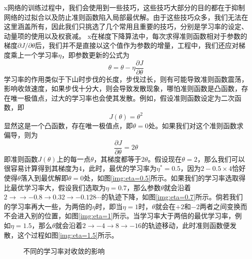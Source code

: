 x网络的训练过程中，我们会使用到一些技巧，这些技巧大部分的目的都在于抑制网络的过拟合以及防止准则函数陷入局部最优解。由于这些技巧众多，我们无法在这里涵盖所有，因此我们只挑选了几个常用且重要的技巧，分别是学习率的设定、动量项的使用以及权衰减。
x在梯度下降算法中，每次求得准则函数相对于参数的梯度$\partial J /\partial \theta$后，我们并不是直接以这个值作为参数的增量，工程中，我们还应对梯度乘上一个学习率$\eta$，即参数更新的公式为
\begin{equation}
\theta = \theta - \eta \frac{\partial J}{\partial \theta}
\label{equ:grandianDes}
\end{equation}
学习率的作用类似于下山时步伐的长度，步伐过长，则有可能导致准则函数震荡，影响收敛速度，如果步伐十分大，则会导致发散现象，哪怕准则函数是凸函数，存在唯一极值点，过大的学习率也会使其发散。例如，假设准则函数设定为二次函数，即
\begin{equation}
J(\theta) = \theta^2
\end{equation}
显然这是一个凸函数，存在唯一极值点，即$\theta = 0$处。如果我们对这个准则函数求偏导，则为
\begin{equation}
\frac{\partial J}{\partial \theta} = 2\theta
\end{equation}
即准则函数$J(\theta)$上的每一点$\theta$，其梯度都等于$2\theta$。假设现在$\theta = 2$，那么我们可以很容易计算得到其梯度为$4$，此时，最优的学习率为$\eta ^* = 0.5$，因为$2-0.5\times 4$恰好使得$\theta$落入到最优解即$\theta = 0$处，如图\ref{img:eta=0.5}所示。如果我们的学习率选取得比最优学习率大，假设我们选取为$\eta  = 0.7$，那么参数$\theta$就会沿着$2\rightarrow \rightarrow -0.8\rightarrow 0.32 \rightarrow -0.128 \cdots$的轨迹下降，如图\ref{img:eta=0.7}所示。倘若我们的学习率再大一些，为两倍的$\eta$时，即当$\eta  = 1$时，$\theta$就会在$+2$和$-2$两者之间变换而不会进入别的位置，如图\ref{img:eta=1}所示。当学习率大于两倍的最优学习率，例如$\eta = 1.5$，那么$\theta$就会沿着$2\rightarrow -4 \rightarrow 8\rightarrow -16$的轨迹移动，此时准则函数便发散，这个过程如图\ref{img:eta=1.5}所示。

\begin{figure}[htbp]
\centering
\subfigure{\label{img:eta=0.5}}\addtocounter{subfigure}{-2}
\subfigure{\label{img:eta=0.7}}\addtocounter{subfigure}{-2}
\subfigure{\label{img:eta=1}}\addtocounter{subfigure}{-2}
\subfigure{\label{img:eta=1.5}}\addtocounter{subfigure}{-2}
\caption{不同的学习率对收敛的影响}
\vspace{-1em}
\end{figure}


